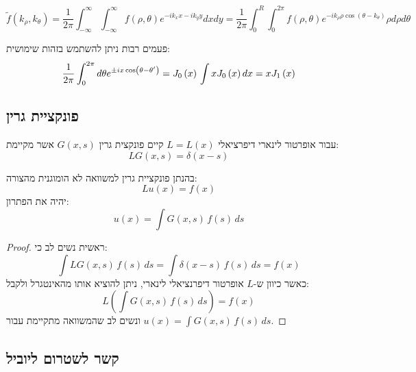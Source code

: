 \documentclass{tstextbook}
\begin{document}
\begin{proposition}
$$\tilde{f}\left(k_\rho,k_\theta\right)=\frac{1}{2\pi}\int_{-\infty}^\infty\int_{-\infty}^\infty f\left( \rho,\theta \right)e^{-ik_xx-ik_yy}dxdy=\frac{1}{2\pi}\int_0^R\int_0^{2\pi}f\left( \rho,\theta \right)e^{-ik_\rho\rho\cos\left( \theta-k_\theta \right)}\rho d\rho d\theta$$

\end{proposition}
\begin{remark}
פעמים רבות ניתן להשתמש בזהות שימושית:
$$\frac{1}{2\pi}\int_{0}^{2\pi}d\theta e^{\pm ix\cos\left(\theta-\theta'\right)}=J_{0}\left(x\right)\\\int xJ_{0}\left(x\right)dx=xJ_{1}\left(x\right)$$

\end{remark}
\subsection{פונקציית גרין}

\begin{definition}
עבור אופרטור לינארי דיפרציאלי \(L=L(x)\) קיים פונקצית גרין \(G(x,s)\) אשר מקיימת:
$$LG(x,s)=\delta(x-s)$$

\end{definition}
\begin{proposition}
בהנתן פונקציית גרין למשוואה לא הומוגנית מהצורה:
$$Lu(x)=f(x)$$
יהיה את הפתרון:
$$u(x)=\int G(x,s)\,f(s)\,d s$$

\end{proposition}
\begin{proof}
ראשית נשים לב כי:
$$\int L G(x,s)\,f(s)\,d s=\int\delta(x-s)\,f(s)\,d s=f(x)$$
כאשר כיוון ש-\(L\) אופרטור דיפרנציאלי לינארי, ניתן להוציא אותו מהאינטגרל ולקבל:
$$L\left(\int G(x,s)\,f(s)\,d s\right)=f(x)$$
ונשים לב שהמשוואה מתקיימת עבור \(u(x)=\int G(x,s)\,f(s)\,d s\).

\end{proof}
\subsection{קשר לשטרום ליוביל}
\end{document}
